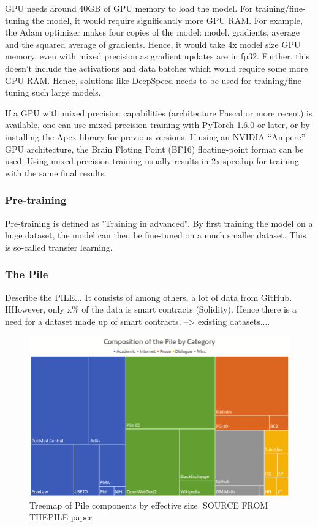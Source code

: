 GPU needs around 40GB of GPU memory to load the model. For training/fine-tuning the model, it would require significantly more GPU RAM. For example, the Adam optimizer makes four copies of the model: model, gradients, average and the squared average of gradients. Hence, it would take 4x model size GPU memory, even with mixed precision as gradient updates are in fp32. Further, this doesn't include the activations and data batches which would require some more GPU RAM. Hence, solutions like DeepSpeed needs to be used for training/fine-tuning such large models.

If a GPU with mixed precision capabilities (architecture Pascal or more recent) is available, one can use mixed precision training with PyTorch 1.6.0 or later, or by installing the Apex library for previous versions. If using an NVIDIA “Ampere” GPU architecture, the Brain Floting Point (BF16) floating-point format can be used. Using mixed precision training usually results in 2x-speedup for training with the same final results.

\subsubsection{Pre-training}
Pre-training is defined as "Training in advanced". By first training the model on a huge dataset, the model can then be fine-tuned on a much smaller dataset. This is so-called transfer learning.

\subsubsection{The Pile}
\label{sec:the-pile}
Describe the  PILE...  It consists of among others, a lot of data from GitHub. HHowever, only x\% of the data is smart contracts (Solidity). Hence there is a need for a dataset made up of smart contracts. --> existing datasets....

\begin{figure}[htp]
    \centering
    \includegraphics[width=\textwidth]{figures/Treemap-of-Pile-components-by-effective-size.png}
    \caption{Treemap of Pile components by effective size. SOURCE FROM THEPILE paper}
    \label{fig:flowchart}
\end{figure}

